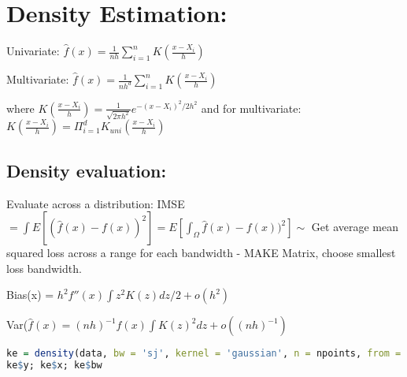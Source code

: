 \section*{Density Estimation:}

Univariate: $\hat{f}(x)=\frac{1}{nh}\sum^{n}_{i=1}K(\frac{x-X_i}{h})$

\noindent Multivariate: $\hat{f}(x) = \frac{1}{nh^d}\sum^{n}_{i=1}K(\frac{x-X_i}{h})$

\noindent where $K(\frac{x-X_i}{h}) = \frac{1}{\sqrt{2\pi h^2}}e^{-(x-X_i)^2/2h^2}$ and for multivariate: $K(\frac{x-X_i}{h}) = \Pi^d_{i=1}K_{uni}(\frac{x-X_i}{h}) $

\subsection*{Density evaluation:}

Evaluate across a distribution: IMSE $= \int E[(\hat{f}(x)-f(x))^2] = E[\int_\Omega \hat{f}(x)-f(x))^2] \sim$  Get average mean squared loss across a range for each bandwidth - MAKE Matrix, choose smallest loss bandwidth.

\noindent Bias(x) = $h^2f''(x)\int z^2 K(z) dz/2 + o(h^2)$

\noindent Var($\hat{f}(x) = (nh)^{-1} f(x) \int K(z)^2 dz + o((nh)^{-1})$

\begin{lstlisting}[language = R]
ke = density(data, bw = 'sj', kernel = 'gaussian', n = npoints, from = -1, to = 5)
ke$y; ke$x; ke$bw
\end{lstlisting}